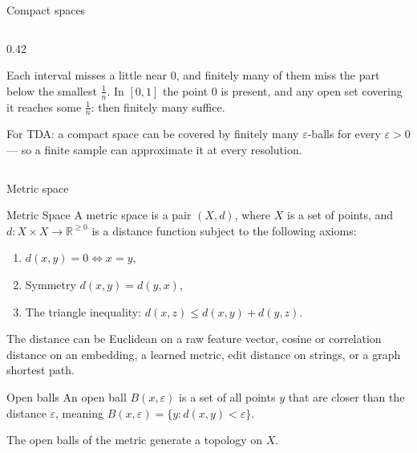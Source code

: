 \documentclass[10pt,aspectratio=169]{beamer}
\begin{document}
\begin{frame}[shrink=3]{Compact spaces}
\begin{columns}[T,onlytextwidth]
\begin{column}{0.42\textwidth}
                \vspace{0.3em}
                \footnotesize\raggedright
                Each interval misses a little near $0$, and finitely many of them miss
                the part below the smallest $\tfrac1n$. In $[0,1]$ the point $0$ is
                present, and any open set covering it reaches some $\tfrac1n$: then
                finitely many suffice.

                \vspace{0.3em}
                \alert{For TDA:} a compact space can be covered by finitely many
                $\varepsilon$-balls for every $\varepsilon>0$ --- so a finite sample can
                approximate it at every resolution.
            \end{column}
        \end{columns}
    \end{frame}

    \begin{frame}[shrink=8]{Metric space}
        \begin{block}{Metric Space}
            A metric space is a pair $(X, d)$, where $X$ is a set of points, and $d: X\times X\to \mathbb{R}^{\geq 0}$ is a distance function subject to the following axioms:
            \begin{enumerate}
                \item $d(x,y)=0 \iff x=y$,
                \item Symmetry $d(x,y)=d(y,x)$,
                \item The triangle inequality: $d(x,z)\le d(x,y)+d(y,z)$.
            \end{enumerate}
        \end{block}

        The distance can be Euclidean on a raw feature vector, cosine or correlation distance on an embedding, a learned metric, edit distance on strings, or a graph shortest path.

        \begin{block}{Open balls}
            An open ball $B(x, \varepsilon)$ is a set of all points $y$ that are closer than the distance $\varepsilon$, meaning $B(x,\varepsilon)=\{y: d(x,y)<\varepsilon \}$.
        \end{block}

        \vspace{0.5em}
        \alert{The open balls of the metric generate a topology on $X$.}
    \end{frame}
\end{document}
